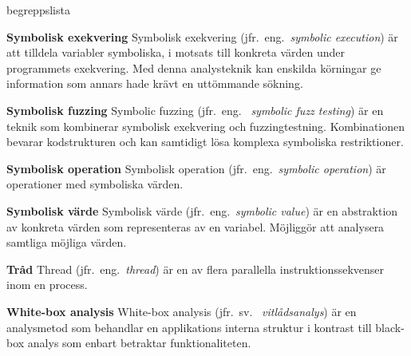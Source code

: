\begin{labeling}{begreppslista}

    \item [\textbf{Symbolisk exekvering}] Symbolisk exekvering (jfr.\ eng.\
    \emph{symbolic execution}) är att tilldela variabler symboliska, i motsats
    till konkreta värden under programmets exekvering. Med denna analysteknik
    kan enskilda körningar ge information som annars hade krävt en uttömmande
    sökning.

    \item [\textbf{Symbolisk fuzzing}] Symbolic fuzzing (jfr.\ eng.
    \ \emph{symbolic fuzz testing}) är en teknik som kombinerar symbolisk
    exekvering och fuzzingtestning. Kombinationen bevarar kodstrukturen och kan
    samtidigt lösa komplexa symboliska restriktioner.

    \item [\textbf{Symbolisk operation}] Symbolisk operation (jfr.\ eng.\ \emph{symbolic
        operation}) är operationer med symboliska värden.

    \item [\textbf{Symbolisk värde}] Symbolisk värde (jfr.\ eng.\ \emph{symbolic
        value}) är en abstraktion av konkreta värden som representeras av en
    variabel. Möjliggör att analysera samtliga möjliga värden.

    \item [\textbf{Tråd}] Thread (jfr.\ eng.\ \emph{thread}) är en av flera
    parallella instruktionssekvenser inom en process.

    \item [\textbf{White-box analysis}] White-box analysis (jfr.\ sv.
    \ \emph{vitlådsanalys}) är en analysmetod som behandlar en applikations
    interna struktur i kontrast till black-box analys som enbart betraktar
    funktionaliteten.

\end{labeling}
